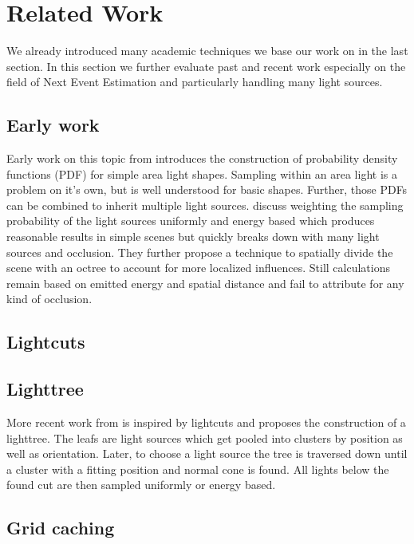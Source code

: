 \chapter{Related Work}
\label{ch:Prev}

We already introduced many academic techniques we base our work on in the last section. In this section we further evaluate past and recent work especially on the field of Next Event Estimation and particularly handling many light sources.

\section{Early work}

Early work on this topic from \parencite{Shirley:1996:MCT:226150.226151} introduces the construction of probability density functions (PDF) for simple area light shapes. Sampling within an area light is a problem on it's own, but is well understood for basic shapes. Further, those PDFs can be combined to inherit multiple light sources. \parencite{Shirley:1996:MCT:226150.226151} discuss weighting the sampling probability of the light sources uniformly and energy based which produces reasonable results in simple scenes but quickly breaks down with many light sources and occlusion. They further propose a technique to spatially divide the scene with an octree to account for more localized influences. Still calculations remain based on emitted energy %
and spatial distance and fail to attribute for any kind of occlusion.

\section{Lightcuts}

\section{Lighttree}

More recent work from \textcite{Estevez} is inspired by lightcuts \parencite{Walter2005LightcutsAS} and proposes the construction of a lighttree. The leafs are light sources which get pooled into clusters by position as well as orientation. Later, to choose a  light source the tree is traversed down until a cluster with a fitting position and normal cone is found. All lights below the found cut are then sampled uniformly or energy based.

\section{Grid caching}

